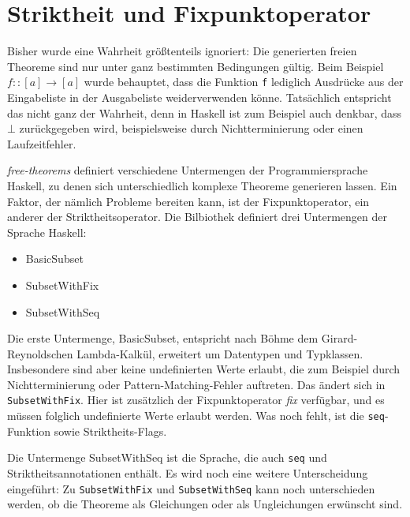 \section{Striktheit und Fixpunktoperator}

\label{sec:striktheit-und-rekursion}

Bisher wurde eine Wahrheit größtenteils ignoriert: Die generierten freien Theoreme sind nur unter ganz bestimmten
Bedingungen gültig. Beim Beispiel \texttt{$f :: [a] \rightarrow [a]$} wurde behauptet, dass die Funktion \texttt{f}
lediglich Ausdrücke aus der Eingabeliste in der Ausgabeliste weiderverwenden könne. Tatsächlich entspricht das nicht ganz der
Wahrheit, denn in Haskell ist zum Beispiel auch denkbar, dass $\bot$ zurückgegeben wird, beispielsweise
durch Nichtterminierung oder einen Laufzeitfehler.

\textit{free-theorems} definiert verschiedene Untermengen der Programmiersprache Haskell, zu denen sich unterschiedlich komplexe
Theoreme generieren lassen. Ein Faktor, der nämlich Probleme bereiten kann, ist der Fixpunktoperator, ein anderer der
Striktheitsoperator.
Die Bilbiothek definiert drei Untermengen der Sprache Haskell:

\begin{itemize}
   \item BasicSubset
   \item SubsetWithFix
   \item SubsetWithSeq
\end{itemize}

Die erste Untermenge, BasicSubset, entspricht nach Böhme \cite{freetheorems} dem Girard-Reynoldschen Lambda-Kalkül, erweitert um Datentypen und
Typklassen. Insbesondere sind aber keine undefinierten Werte erlaubt, die zum Beispiel durch Nichtterminierung
oder Pattern-Matching-Fehler auftreten.
Das ändert sich in \texttt{SubsetWithFix}. Hier ist zusätzlich der Fixpunktoperator \textit{fix} verfügbar, und es müssen folglich undefinierte
Werte erlaubt werden. Was noch fehlt, ist die \texttt{seq}-Funktion sowie Striktheits-Flags.

Die Untermenge SubsetWithSeq ist die Sprache, die auch \texttt{seq} und Striktheitsannotationen enthält.
Es wird noch eine weitere Unterscheidung eingeführt: Zu \texttt{SubsetWithFix} und \texttt{SubsetWithSeq} kann noch unterschieden werden,
ob die Theoreme als Gleichungen oder als Ungleichungen erwünscht sind.

